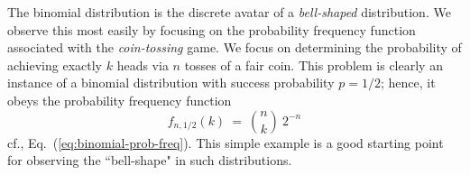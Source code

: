 \bigskip

 

The binomial distribution is the discrete avatar of a {\em bell-shaped} distribution.  We observe this most easily by focusing on the probability frequency function associated with the {\em coin-tossing} game.  We focus on determining the probability of achieving exactly $k$ {\sc head}s via $n$ tosses of a fair coin.  This problem is clearly an instance of a binomial distribution with success probability $p = 1/2$; hence, it obeys the probability frequency function 
\[ f_{n,1/2}(k) \ = \  {n \choose k} \ 2^{-n} \] 
cf., Eq.~(\ref{eq:binomial-prob-freq}).  This simple example is a good starting point for observing the ``bell-shape" in such distributions.

\smallskip

